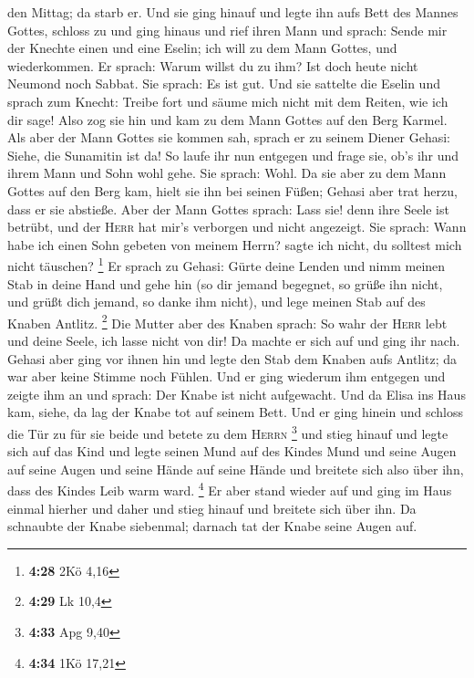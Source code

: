 den Mittag; da starb er.  Und sie ging hinauf und legte
ihn aufs Bett des Mannes Gottes, schloss zu und ging hinaus
 und rief ihren Mann und sprach: Sende mir der Knechte
einen und eine Eselin; ich will zu dem Mann Gottes, und wiederkommen.
 Er sprach: Warum willst du zu ihm? Ist doch heute nicht
Neumond noch Sabbat. Sie sprach: Es ist gut.  Und sie
sattelte die Eselin und sprach zum Knecht: Treibe fort und säume mich
nicht mit dem Reiten, wie ich dir sage!  Also zog sie hin
und kam zu dem Mann Gottes auf den Berg Karmel. Als aber der Mann Gottes
sie kommen sah, sprach er zu seinem Diener Gehasi: Siehe, die Sunamitin
ist da!  So laufe ihr nun entgegen und frage sie, ob's
ihr und ihrem Mann und Sohn wohl gehe. Sie sprach: Wohl. 
Da sie aber zu dem Mann Gottes auf den Berg kam, hielt sie ihn bei
seinen Füßen; Gehasi aber trat herzu, dass er sie abstieße. Aber der
Mann Gottes sprach: Lass sie! denn ihre Seele ist betrübt, und der
\textsc{Herr} hat mir's verborgen und nicht angezeigt. 
Sie sprach: Wann habe ich einen Sohn gebeten von meinem Herrn? sagte ich
nicht, du solltest mich nicht täuschen? \footnote{\textbf{4:28} 2Kö 4,16}
 Er sprach zu Gehasi: Gürte deine Lenden und nimm meinen
Stab in deine Hand und gehe hin (so dir jemand begegnet, so grüße ihn
nicht, und grüßt dich jemand, so danke ihm nicht), und lege meinen Stab
auf des Knaben Antlitz. \footnote{\textbf{4:29} Lk 10,4} 
Die Mutter aber des Knaben sprach: So wahr der \textsc{Herr} lebt und
deine Seele, ich lasse nicht von dir! Da machte er sich auf und ging ihr
nach.  Gehasi aber ging vor ihnen hin und legte den Stab
dem Knaben aufs Antlitz; da war aber keine Stimme noch Fühlen. Und er
ging wiederum ihm entgegen und zeigte ihm an und sprach: Der Knabe ist
nicht aufgewacht.  Und da Elisa ins Haus kam, siehe, da
lag der Knabe tot auf seinem Bett.  Und er ging hinein
und schloss die Tür zu für sie beide und betete zu dem \textsc{Herrn}
\footnote{\textbf{4:33} Apg 9,40}  und stieg hinauf und
legte sich auf das Kind und legte seinen Mund auf des Kindes Mund und
seine Augen auf seine Augen und seine Hände auf seine Hände und breitete
sich also über ihn, dass des Kindes Leib warm ward. \footnote{\textbf{4:34}
  1Kö 17,21}  Er aber stand wieder auf und ging im Haus
einmal hierher und daher und stieg hinauf und breitete sich über ihn. Da
schnaubte der Knabe siebenmal; darnach tat der Knabe seine Augen auf.
